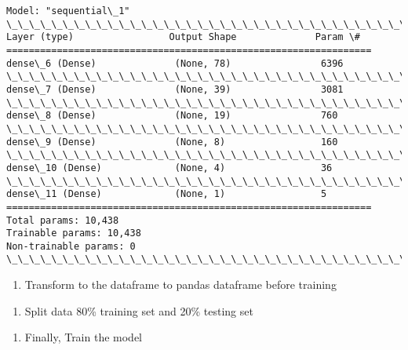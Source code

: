 \documentclass[11pt]{article}
\providecommand{\tightlist}{%
      \setlength{\itemsep}{0pt}\setlength{\parskip}{0pt}}
\begin{document}
    \begin{Verbatim}[commandchars=\\\{\}]
Model: "sequential\_1"
\_\_\_\_\_\_\_\_\_\_\_\_\_\_\_\_\_\_\_\_\_\_\_\_\_\_\_\_\_\_\_\_\_\_\_\_\_\_\_\_\_\_\_\_\_\_\_\_\_\_\_\_\_\_\_\_\_\_\_\_\_\_\_\_\_
Layer (type)                 Output Shape              Param \#
=================================================================
dense\_6 (Dense)              (None, 78)                6396
\_\_\_\_\_\_\_\_\_\_\_\_\_\_\_\_\_\_\_\_\_\_\_\_\_\_\_\_\_\_\_\_\_\_\_\_\_\_\_\_\_\_\_\_\_\_\_\_\_\_\_\_\_\_\_\_\_\_\_\_\_\_\_\_\_
dense\_7 (Dense)              (None, 39)                3081
\_\_\_\_\_\_\_\_\_\_\_\_\_\_\_\_\_\_\_\_\_\_\_\_\_\_\_\_\_\_\_\_\_\_\_\_\_\_\_\_\_\_\_\_\_\_\_\_\_\_\_\_\_\_\_\_\_\_\_\_\_\_\_\_\_
dense\_8 (Dense)              (None, 19)                760
\_\_\_\_\_\_\_\_\_\_\_\_\_\_\_\_\_\_\_\_\_\_\_\_\_\_\_\_\_\_\_\_\_\_\_\_\_\_\_\_\_\_\_\_\_\_\_\_\_\_\_\_\_\_\_\_\_\_\_\_\_\_\_\_\_
dense\_9 (Dense)              (None, 8)                 160
\_\_\_\_\_\_\_\_\_\_\_\_\_\_\_\_\_\_\_\_\_\_\_\_\_\_\_\_\_\_\_\_\_\_\_\_\_\_\_\_\_\_\_\_\_\_\_\_\_\_\_\_\_\_\_\_\_\_\_\_\_\_\_\_\_
dense\_10 (Dense)             (None, 4)                 36
\_\_\_\_\_\_\_\_\_\_\_\_\_\_\_\_\_\_\_\_\_\_\_\_\_\_\_\_\_\_\_\_\_\_\_\_\_\_\_\_\_\_\_\_\_\_\_\_\_\_\_\_\_\_\_\_\_\_\_\_\_\_\_\_\_
dense\_11 (Dense)             (None, 1)                 5
=================================================================
Total params: 10,438
Trainable params: 10,438
Non-trainable params: 0
\_\_\_\_\_\_\_\_\_\_\_\_\_\_\_\_\_\_\_\_\_\_\_\_\_\_\_\_\_\_\_\_\_\_\_\_\_\_\_\_\_\_\_\_\_\_\_\_\_\_\_\_\_\_\_\_\_\_\_\_\_\_\_\_\_
    \end{Verbatim}

    \begin{enumerate}
\def\labelenumi{\arabic{enumi}.}
\setcounter{enumi}{2}
\tightlist
\item
  Transform to the dataframe to pandas dataframe before training
\end{enumerate}

    \begin{enumerate}
\def\labelenumi{\arabic{enumi}.}
\setcounter{enumi}{3}
\tightlist
\item
  Split data 80\% training set and 20\% testing set
\end{enumerate}

    \begin{enumerate}
\def\labelenumi{\arabic{enumi}.}
\setcounter{enumi}{4}
\tightlist
\item
  Finally, Train the model
\end{enumerate}
\end{document}
